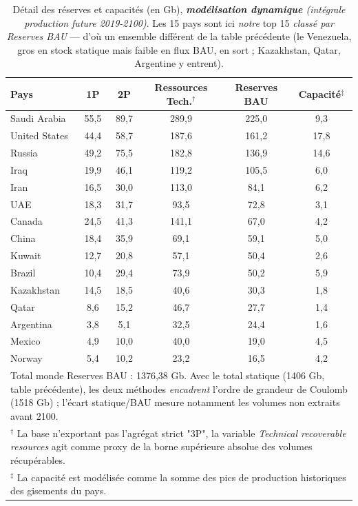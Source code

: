 \documentclass[11pt]{article}
\begin{document}
\begin{table}[htbp]
\centering
\caption{Détail des réserves et capacités (en Gb), \textit{\textbf{modélisation dynamique} (intégrale production future 2019-2100)}. Les 15 pays sont ici \emph{notre} top 15 \emph{classé par Reserves BAU} --- d'où un ensemble différent de la table précédente (le Venezuela, gros en stock statique mais faible en flux BAU, en sort ; Kazakhstan, Qatar, Argentine y entrent).}
\label{tab:detailed_reserves}
\begin{tabular}{lccccc}
\toprule
\textbf{Pays} & \textbf{1P} & \textbf{2P} & \textbf{Ressources Tech.$^\dagger$} & \textbf{Reserves BAU} & \textbf{Capacité$^\ddagger$} \\
\midrule
Saudi Arabia & 55{,}5 & 89{,}7 & 289{,}9 & 225{,}0 & 9{,}3 \\
United States & 44{,}4 & 58{,}7 & 187{,}6 & 161{,}2 & 17{,}8 \\
Russia & 49{,}2 & 75{,}5 & 182{,}8 & 136{,}9 & 14{,}6 \\
Iraq & 19{,}9 & 46{,}1 & 119{,}2 & 105{,}5 & 6{,}0 \\
Iran & 16{,}5 & 30{,}0 & 113{,}0 & 84{,}1 & 6{,}2 \\
UAE & 18{,}3 & 31{,}7 & 93{,}5 & 72{,}8 & 3{,}1 \\
Canada & 24{,}5 & 41{,}3 & 141{,}1 & 67{,}0 & 4{,}2 \\
China & 18{,}4 & 35{,}9 & 69{,}1 & 59{,}1 & 5{,}0 \\
Kuwait & 12{,}7 & 20{,}8 & 57{,}1 & 50{,}4 & 2{,}6 \\
Brazil & 10{,}4 & 29{,}4 & 73{,}9 & 50{,}2 & 5{,}9 \\
Kazakhstan & 14{,}5 & 18{,}5 & 40{,}6 & 30{,}3 & 1{,}8 \\
Qatar & 8{,}6 & 15{,}2 & 46{,}7 & 27{,}7 & 1{,}4 \\
Argentina & 3{,}8 & 5{,}1 & 32{,}5 & 24{,}4 & 1{,}6 \\
Mexico & 4{,}9 & 10{,}0 & 40{,}0 & 19{,}0 & 4{,}5 \\
Norway & 5{,}4 & 10{,}2 & 23{,}2 & 16{,}5 & 4{,}2 \\
\bottomrule
\multicolumn{6}{p{14cm}}{\small Total monde Reserves BAU : 1376{,}38 Gb. Avec le total statique (1406 Gb, table précédente), les deux méthodes \emph{encadrent} l'ordre de grandeur de Coulomb (1518 Gb) ; l'écart statique/BAU mesure notamment les volumes non extraits avant 2100.} \\
\multicolumn{6}{p{14cm}}{\small $^\dagger$ La base n'exportant pas l'agrégat strict "3P", la variable \emph{Technical recoverable resources} agit comme proxy de la borne supérieure absolue des volumes récupérables.} \\
\multicolumn{6}{p{14cm}}{\small $^\ddagger$ La capacité est modélisée comme la somme des pics de production historiques des gisements du pays.} \\
\end{tabular}
\end{table}
\end{document}
